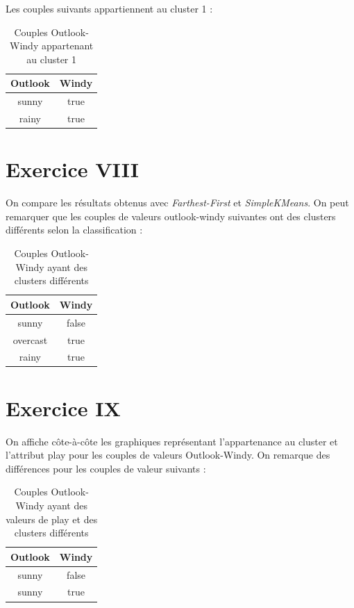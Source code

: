 \documentclass[a4paper, 11pt]{report}
\begin{document}
        Les couples suivants appartiennent au cluster 1 : 
        \begin{table}[h!]
        \centering
        \begin{tabular}{| c | c |}
         \hline
         Outlook & Windy \\
         \hline
         sunny & true \\
         rainy & true \\
         \hline
        
        \end{tabular}
        \caption{Couples Outlook-Windy appartenant au cluster 1}
        \label{tab:exo7_2}
        \end{table}
        
        \section{Exercice VIII}
        On compare les résultats obtenus avec \emph{Farthest-First} et \emph{SimpleKMeans}. On peut remarquer que les couples de valeurs outlook-windy suivantes ont des clusters différents selon la classification : 
        \begin{table}[h!]
        \centering
        \begin{tabular}{| c | c |}
         \hline
         Outlook & Windy \\
         \hline
         sunny & false \\
         overcast & true \\
         rainy & true\\
         \hline
        
        \end{tabular}
        \caption{Couples Outlook-Windy ayant des clusters différents}
        \label{tab:exo8}
        \end{table}
        
        \section{Exercice IX}
        On affiche côte-à-côte les graphiques représentant l'appartenance au cluster et l'attribut play pour les couples de valeurs Outlook-Windy.
        On remarque des différences pour les couples de valeur suivants :
        \begin{table}[h!]
        \centering
        \begin{tabular}{| c | c |}
         \hline
         Outlook & Windy \\
         \hline
         sunny & false \\
         sunny & true \\
         \hline
        
        \end{tabular}
        \caption{Couples Outlook-Windy ayant des valeurs de play et des clusters différents}
        \label{tab:exo9}
        \end{table}
        
\end{document}
